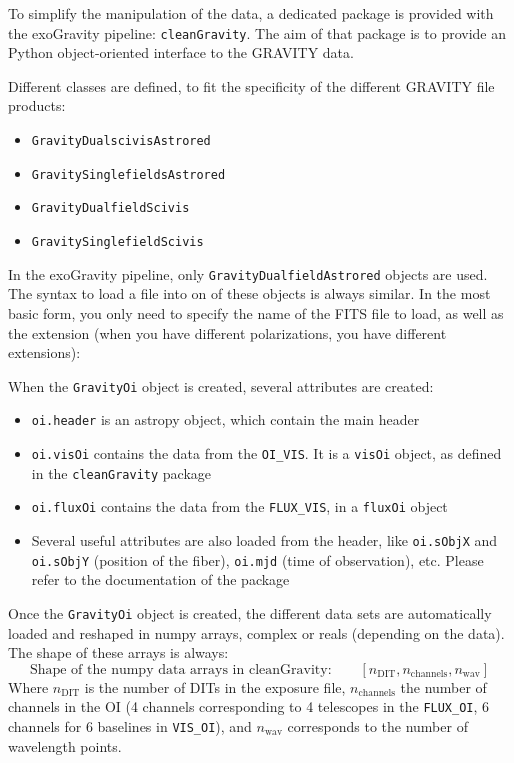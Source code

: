 To simplify the manipulation of the data, a dedicated package is provided with the exoGravity pipeline: \verb|cleanGravity|. The aim of that package is to provide an Python object-oriented interface to the GRAVITY data.

Different classes are defined, to fit the specificity of the different GRAVITY file products:
\begin{itemize}
\item{\verb|GravityDualscivisAstrored|}
\item{\verb|GravitySinglefieldsAstrored|}
\item{\verb|GravityDualfieldScivis|}
\item{\verb|GravitySinglefieldScivis|}
\end{itemize}

In the exoGravity pipeline, only \verb|GravityDualfieldAstrored| objects are used. The syntax to load a file into on of these objects is always similar. In the most basic form, you only need to specify the name of the FITS file to load, as well as the extension (when you have different polarizations, you have different extensions): 


\noindent{}When the \verb|GravityOi| object is created, several attributes are created:
\begin{itemize}
\item{\verb|oi.header| is an astropy object, which contain the main header}
\item{\verb|oi.visOi| contains the data from the \verb|OI_VIS|. It is a \verb|visOi| object, as defined in the \verb|cleanGravity| package}
\item{\verb|oi.fluxOi| contains the data from the \verb|FLUX_VIS|, in a \verb|fluxOi| object}
\item{Several useful attributes are also loaded from the header, like \verb|oi.sObjX| and \verb|oi.sObjY| (position of the fiber), \verb|oi.mjd| (time of observation), etc. Please refer to the documentation of the package}
\end{itemize}

Once the \verb|GravityOi| object is created, the different data sets are automatically loaded and reshaped in numpy arrays, complex or reals (depending on the data). The shape of these arrays is always:
\begin{equation*}
\text{Shape of the numpy data arrays in cleanGravity:} \qquad \left[n_\mathrm{DIT}, n_\mathrm{channels}, n_\mathrm{wav}\right]
\end{equation*}
\noindent{}Where $n_\mathrm{DIT}$ is the number of DITs in the exposure file, $n_\mathrm{channels}$ the number of channels in the OI (4 channels corresponding to 4 telescopes in the \verb|FLUX_OI|, 6 channels for 6 baselines in \verb|VIS_OI|), and $n_\mathrm{wav}$ corresponds to the number of wavelength points.

